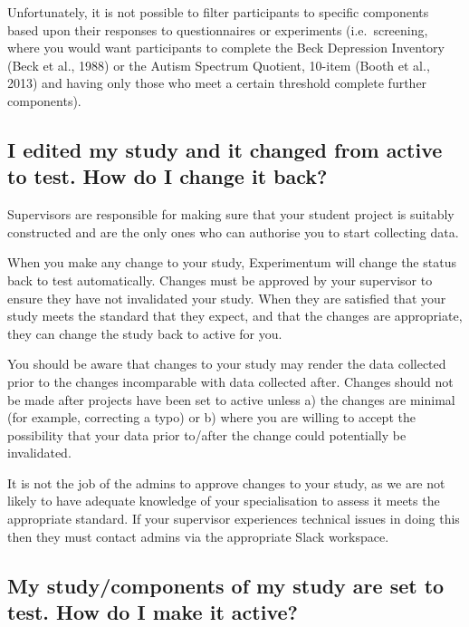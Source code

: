\documentclass[]{book}
\begin{document}
Unfortunately, it is not possible to filter participants to specific components based upon their responses to questionnaires or experiments (i.e.~screening, where you would want participants to complete the Beck Depression Inventory (Beck et al., 1988) or the Autism Spectrum Quotient, 10-item (Booth et al., 2013) and having only those who meet a certain threshold complete further components).

\hypertarget{i-edited-my-study-and-it-changed-from-active-to-test.-how-do-i-change-it-back}{%
\subsection*{I edited my study and it changed from active to test. How do I change it back?}\label{i-edited-my-study-and-it-changed-from-active-to-test.-how-do-i-change-it-back}}

Supervisors are responsible for making sure that your student project is suitably constructed and are the only ones who can authorise you to start collecting data.

When you make any change to your study, Experimentum will change the status back to test automatically. Changes must be approved by your supervisor to ensure they have not invalidated your study. When they are satisfied that your study meets the standard that they expect, and that the changes are appropriate, they can change the study back to active for you.

You should be aware that changes to your study may render the data collected prior to the changes incomparable with data collected after. Changes should not be made after projects have been set to active unless a) the changes are minimal (for example, correcting a typo) or b) where you are willing to accept the possibility that your data prior to/after the change could potentially be invalidated.

It is not the job of the admins to approve changes to your study, as we are not likely to have adequate knowledge of your specialisation to assess it meets the appropriate standard. If your supervisor experiences technical issues in doing this then they must contact admins via the appropriate Slack workspace.

\hypertarget{my-studycomponents-of-my-study-are-set-to-test.-how-do-i-make-it-active}{%
\subsection*{My study/components of my study are set to test. How do I make it active?}\label{my-studycomponents-of-my-study-are-set-to-test.-how-do-i-make-it-active}}
\end{document}
